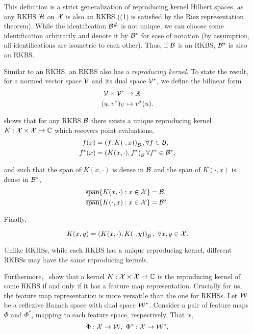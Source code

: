This definition is a strict generalization of reproducing kernel Hilbert spaces, as any RKHS ${\mathcal{H}}$ on ${\mathcal{X}}$ is also an RKBS ((1) is satisfied by the Riez representation theorem). While the identification ${\mathcal{B}}^\#$ is not unique, we can choose some identification arbitrarily and denote it by ${\mathcal{B}}^*$ for ease of notation (by assumption, all identifications are isometric to each other). Thus, if ${\mathcal{B}}$ is an RKBS, ${\mathcal{B}}^*$ is also an RKBS.

Similar to an RKHS, an RKBS also has a \textit{reproducing kernel}. To state the result, for a normed vector space ${\mathcal{V}}$ and its dual space ${\mathcal{V}}^*$, we define the bilinear form
\begin{equation}\label{eq:bilinear_form}
    \begin{split}
        {\mathcal{V}} \times {\mathcal{V}}^* &\to \mathbb{R}\\
        (u, v^*)_{\mathcal{V}} &\mapsto v^*(u).
    \end{split}
\end{equation}

\citep[Theorem 2]{zhangReproducingKernel2009} shows that for any RKBS ${\mathcal{B}}$ there exists a unique reproducing kernel $K: {\mathcal{X}} \times {\mathcal{X}} \to {\mathbb{C}}$ which recovers point evaluations,
\begin{align}
    f(x) &= \left(f, K(\cdot, x)\right)_{\mathcal{B}}, \forall f \in {\mathcal{B}}, \\
    f^*(x) &= \left(K(x, \cdot), f^*\right)_{\mathcal{B}} \forall f^* \in {\mathcal{B}}^*,
\end{align}

and such that the span of $K(x, \cdot)$ is dense in ${\mathcal{B}}$ and the span of $K(\cdot, x)$ is dense in ${\mathcal{B}}^*$,
\begin{align}
    \overline{\text{span}}\{K(x, \cdot): x \in {\mathcal{X}}\} &= {\mathcal{B}}, \\
    \overline{\text{span}}\{K(\cdot, x): x \in {\mathcal{X}}\} &= {\mathcal{B}}^*.
\end{align}

Finally,

\begin{equation}
    K(x, y) = \left(K(x, \cdot), K(\cdot, y)\right)_{\mathcal{B}}, \ \forall x, y \in {\mathcal{X}}.
\end{equation}

Unlike RKHSs, while each RKBS has a unique reproducing kernel, different RKBSs may have the same reproducing kernels.

Furthermore,~\citep[Theorems 3 and 4]{zhangReproducingKernel2009} show that a kernel $K: {\mathcal{X}} \times {\mathcal{X}} \to {\mathbb{C}}$ is the reproducing kernel of some RKBS if and only if it has a feature map representation. Crucially for us, the feature map representation is more versatile than the one for RKHSs. Let ${\mathcal{W}}$ be a reflexive Banach space with dual space ${\mathcal{W}}^*$. Consider a pair of feature maps $\Phi$ and $\Phi^*$, mapping to each feature space, respectively. That is,
\begin{equation*}
    \Phi: {\mathcal{X}} \to {\mathcal{W}}, \ \Phi^*: {\mathcal{X}} \to {\mathcal{W}}^*,
\end{equation*}


